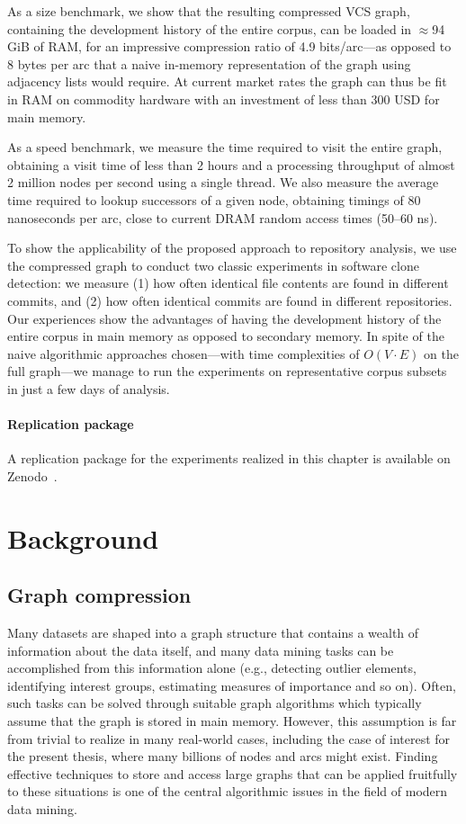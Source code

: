 As a size benchmark, we show that the resulting compressed VCS graph, containing
the development history of the entire corpus, can be loaded in $\approx$94\,GiB
of RAM, for an impressive compression ratio of 4.9 bits/arc---as opposed to 8
bytes per arc that a naive in-memory representation of the graph using
adjacency lists would require. At current market rates the graph can thus be
fit in RAM on commodity hardware with an investment of less than 300 USD for
main memory.

As a speed benchmark, we measure the time required to visit the entire graph,
obtaining a visit time of less than 2 hours and a processing throughput of
almost 2 million nodes per second using a single thread. We also measure the
average time required to lookup successors of a given node, obtaining timings
of 80 nanoseconds per arc, close to current DRAM random access times (50--60
ns).

To show the applicability of the proposed approach to repository analysis, we
use the compressed graph to conduct two classic experiments in software clone
detection: we measure (1) how often identical file contents are found in
different commits, and (2) how often identical commits are found in different
repositories. Our experiences show the advantages of having the development
history of the entire corpus in main memory as opposed to secondary memory.
In spite of the naive algorithmic approaches chosen---with time complexities
of $O(V\cdot E)$ on the full graph---we manage to run the experiments on
representative corpus subsets in just a few days of analysis.

\paragraph*{Replication package}
A replication package for the experiments realized in this chapter is available
on Zenodo~\cite{swh-saner2020graph-replication}.

\section{Background}%
\label{sec:compression-background}

\subsection{Graph compression}

Many datasets are shaped into a graph structure that contains a wealth of
information about the data itself, and many data mining tasks can be
accomplished from this information alone (e.g., detecting outlier elements,
identifying interest groups, estimating measures of importance and so
on). Often, such tasks can be solved through suitable graph algorithms which
typically assume that the graph is stored in main memory.  However, this
assumption is far from trivial to realize in many real-world cases, including
the case of interest for the present thesis, where many billions of nodes and
arcs might exist. Finding effective techniques to store and access large graphs
that can be applied fruitfully to these situations is one of the central
algorithmic issues in the field of modern data mining.


